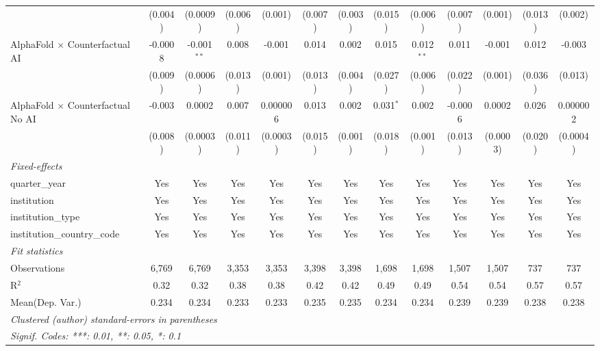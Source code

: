 \begin{tabular}{lcccccccccccc}
                                            & (0.004) & (0.0009)      & (0.006) & (0.001)  & (0.007) & (0.003) & (0.015)     & (0.006)      & (0.007)       & (0.001)        & (0.013)      & (0.002)\\   
   AlphaFold $\times$ Counterfactual AI     & -0.0008 & -0.001$^{**}$ & 0.008   & -0.001   & 0.014   & 0.002   & 0.015       & 0.012$^{**}$ & 0.011         & -0.001         & 0.012        & -0.003\\   
                                            & (0.009) & (0.0006)      & (0.013) & (0.001)  & (0.013) & (0.004) & (0.027)     & (0.006)      & (0.022)       & (0.001)        & (0.036)      & (0.013)\\   
   AlphaFold $\times$ Counterfactual No AI  & -0.003  & 0.0002        & 0.007   & 0.000006 & 0.013   & 0.002   & 0.031$^{*}$ & 0.002        & -0.0006       & 0.0002         & 0.026        & 0.000002\\   
                                            & (0.008) & (0.0003)      & (0.011) & (0.0003) & (0.015) & (0.001) & (0.018)     & (0.001)      & (0.013)       & (0.0003)       & (0.020)      & (0.0004)\\   
   \midrule
   \emph{Fixed-effects}\\
   quarter\_year                            & Yes     & Yes           & Yes     & Yes      & Yes     & Yes     & Yes         & Yes          & Yes           & Yes            & Yes          & Yes\\  
   institution                              & Yes     & Yes           & Yes     & Yes      & Yes     & Yes     & Yes         & Yes          & Yes           & Yes            & Yes          & Yes\\  
   institution\_type                        & Yes     & Yes           & Yes     & Yes      & Yes     & Yes     & Yes         & Yes          & Yes           & Yes            & Yes          & Yes\\  
   institution\_country\_code               & Yes     & Yes           & Yes     & Yes      & Yes     & Yes     & Yes         & Yes          & Yes           & Yes            & Yes          & Yes\\  
   \midrule
   \emph{Fit statistics}\\
   Observations                             & 6,769   & 6,769         & 3,353   & 3,353    & 3,398   & 3,398   & 1,698       & 1,698        & 1,507         & 1,507          & 737          & 737\\  
   R$^2$                                    & 0.32    & 0.32          & 0.38    & 0.38     & 0.42    & 0.42    & 0.49        & 0.49         & 0.54          & 0.54           & 0.57         & 0.57\\  
Mean(Dep. Var.) & 0.234 & 0.234 & 0.233 & 0.233 & 0.235 & 0.235 & 0.234 & 0.234 & 0.239 & 0.239 & 0.238 & 0.238 \\
   \midrule \midrule
   \multicolumn{13}{l}{\emph{Clustered (author) standard-errors in parentheses}}\\
   \multicolumn{13}{l}{\emph{Signif. Codes: ***: 0.01, **: 0.05, *: 0.1}}\\
\end{tabular}
\par\endgroup
